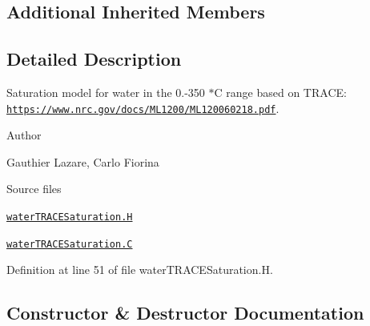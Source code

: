 \subsection*{Additional Inherited Members}


\subsection{Detailed Description}
Saturation model for water in the 0.-\/350 $\ast$C range based on T\+R\+A\+CE\+: \href{https://www.nrc.gov/docs/ML1200/ML120060218.pdf}{\tt https\+://www.\+nrc.\+gov/docs/\+M\+L1200/\+M\+L120060218.\+pdf}. 

\label{_Description}%
 Author \begin{DoxyVerb}Gauthier Lazare, Carlo Fiorina
\end{DoxyVerb}


\begin{DoxyParagraph}{Source files}

\begin{DoxyItemize}
\item \href{../../../home/carlo/data/GeN-Foam/GeN-Foam_ffn/GeN-Foam/GeN-Foam/classes/thermalHydraulics/src/physicsModels/phaseChangeModels/saturationModels/waterTRACE/waterTRACESaturation.H}{\tt water\+T\+R\+A\+C\+E\+Saturation.\+H} 
\item \href{../../../home/carlo/data/GeN-Foam/GeN-Foam_ffn/GeN-Foam/GeN-Foam/classes/thermalHydraulics/src/physicsModels/phaseChangeModels/saturationModels/waterTRACE/waterTRACESaturation.C}{\tt water\+T\+R\+A\+C\+E\+Saturation.\+C} 
\end{DoxyItemize}
\end{DoxyParagraph}


Definition at line 51 of file water\+T\+R\+A\+C\+E\+Saturation.\+H.



\subsection{Constructor \& Destructor Documentation}
\mbox{\label{classFoam_1_1saturationModels_1_1waterTRACE_a4c5fc9a21939293271547086c6f79743}} 
